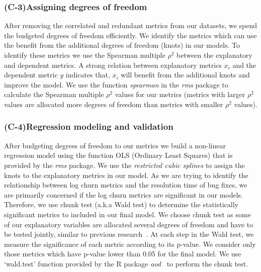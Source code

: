 \subsubsection*{(C-3)Assigning degrees of freedom}


After removing the correlated and redundant metrics from our datasets, we spend the budgeted degrees of freedom efficiently. We identify the metrics which can use the benefit from the additional degrees of freedom (knots) in our models. To identify these metrics we use the Spearman multiple $\rho^{2}$ between the explanatory and dependent metrics. A strong relation between explanatory metrics $x_{i}$ and the dependent metric $y$ indicates that, $x_{i}$ will benefit from the additional knots and improve the model. We use the function \textsl{spearman} in the \textsl{rms} package to calculate the Spearman multiple $\rho^{2}$ values for our metrics (metrics with larger $\rho^{2}$  values are allocated more degrees of freedom than metrics with smaller $\rho^{2}$ values).

\subsubsection*{(C-4)Regression modeling and validation}

After budgeting degrees of freedom to our metrics we build a non-linear regression model using the function OLS (Ordinary Least Squares) that is provided by the \textsl{rms} package. We use the \textsl{restricted cubic splines} to assign the knots to the explanatory metrics in our model. 
As we are trying to identify the relationship between log churn metrics and the resolution time of bug fixes, we are primarily concerned if the log churn metrics are significant in our models. Therefore, we use chunk test (a.k.a Wald test) to determine the statistically significant metrics to included in our final model. We choose chunk test as some of our explanatory variables are allocated several degrees of freedom and have to be tested jointly, similar to previous research~\cite{ShaneOLS}. At each step in the Wald test, we measure the significance of each metric according to its p-value. We consider only those metrics which have p-value lower than 0.05 for the final model. We use `wald.test' function provided by the R package \emph{aod}~\cite{waldtest} to perform the chunk test.  
%




